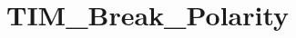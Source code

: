 \hypertarget{group___t_i_m___break___polarity}{\section{T\-I\-M\-\_\-\-Break\-\_\-\-Polarity}
\label{group___t_i_m___break___polarity}
}
